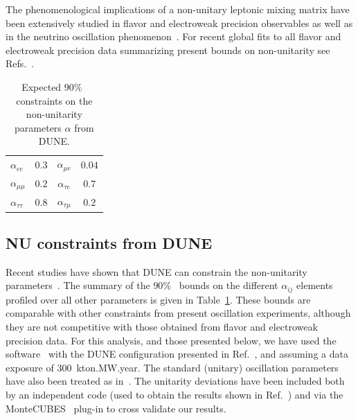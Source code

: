 The phenomenological implications of a non-unitary leptonic mixing matrix have been extensively studied in flavor and electroweak precision observables as well as in the neutrino oscillation phenomenon~\cite{Shrock:1980vy,Schechter:1980gr,Shrock:1980ct,Shrock:1981wq,Langacker:1988ur,Bilenky:1992wv,Nardi:1994iv,Tommasini:1995ii,Antusch:2006vwa,FernandezMartinez:2007ms,Antusch:2008tz,Biggio:2008in,Antusch:2009pm,Forero:2011pc,Alonso:2012ji,Antusch:2014woa,Abada:2015trh,Fernandez-Martinez:2015hxa,Escrihuela:2015wra,Parke:2015goa,Miranda:2016wdr,Fong:2016yyh,Escrihuela:2016ube}. For recent global fits to all flavor and electroweak precision data summarizing present bounds on non-unitarity see Refs.~\cite{Antusch:2014woa,Fernandez-Martinez:2016lgt}. 

\begin{table}[htb]
\caption[Expected 90\%~CL constraints on the non-unitarity parameters $\alpha$]{\label{tab:bounds} Expected $90 \%$~  constraints on the non-unitarity parameters $\alpha$ from DUNE. }
\begin{center}
\renewcommand{\arraystretch}{1.6}
\begin{tabular}{  l@{\quad\quad}  c@{\quad\quad}   c@{\quad\quad}   c@{\quad\quad}      }
\hline
$\alpha_{ee}$ & $0.3$ & $\alpha_{\mu e}$ & $0.04$  \\
$\alpha_{\mu\mu}$ & $0.2$ & $\alpha_{\tau e}$ & $0.7$ \\
$\alpha_{\tau\tau}$ & $0.8$ & $\alpha_{\tau\mu}$ & $0.2$  \\ \hline
\end{tabular}
\end{center}
\end{table}

\subsection{NU constraints from DUNE}
Recent studies have shown that DUNE can constrain the non-unitarity parameters~\cite{Blennow:2016jkn, Escrihuela:2016ube}. The summary of the $90 \%$~  bounds on the different $\alpha_{ij}$ elements profiled over all other parameters is given in Table~\ref{tab:bounds}. 
These bounds are comparable with other constraints from present oscillation experiments, although they are not competitive with those obtained from flavor and electroweak precision data.
For this analysis, and %
those presented below, we have used the   software~\cite{Huber:2004ka,Huber:2007ji} with the DUNE  configuration presented in Ref.~\cite{Alion:2016uaj}, and assuming a data exposure of 300~kton.MW.year. The standard (unitary) oscillation parameters have also been treated as in~\cite{Alion:2016uaj}. The unitarity deviations have been included both by an independent code (used to obtain the results shown in Ref.~\cite{Escrihuela:2016ube}) and via the MonteCUBES~\cite{Blennow:2009pk} plug-in to cross validate our results.

